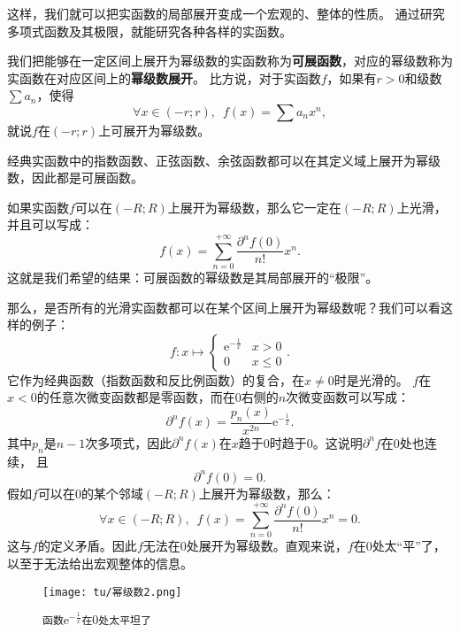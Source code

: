 \documentclass[12pt,UTF8]{ctexbook}
\theoremstyle{definition}
\theoremstyle{plain}
\newtheorem{sk}{思考}[section]
\begin{document}
这样，我们就可以把实函数的局部展开变成一个宏观的、整体的性质。
通过研究多项式函数及其极限，就能研究各种各样的实函数。

我们把能够在一定区间上展开为幂级数的实函数称为\textbf{可展函数}，对应的幂级数称为实函数在对应区间上的\textbf{幂级数展开}。
比方说，对于实函数$f$，如果有$r>0$和级数$\sum a_n$，使得
$$\forall x\in (-r;r),\,\,\, f(x) = \sum a_n x^n,$$
就说$f$在$(-r;r)$上可展开为幂级数。

经典实函数中的指数函数、正弦函数、余弦函数都可以在其定义域上展开为幂级数，因此都是可展函数。

如果实函数$f$可以在$(-R;R)$上展开为幂级数，那么它一定在$(-R;R)$上光滑，并且可以写成：
$$ f(x) = \sum_{n=0}^{+\infty} \frac{\partial^n f(0)}{n!} x^n. $$
这就是我们希望的结果：可展函数的幂级数是其局部展开的“极限”。

那么，是否所有的光滑实函数都可以在某个区间上展开为幂级数呢？我们可以看这样的例子：
$$ f: x\mapsto \begin{cases} \mathrm{e}^{-\frac{1}{x}} & x > 0 \\ 0 & x \leqslant 0 \end{cases}.$$
它作为经典函数（指数函数和反比例函数）的复合，在$x\neq 0$时是光滑的。
$f$在$x<0$的任意次微变函数都是零函数，而在$0$右侧的$n$次微变函数可以写成：
$$ \partial^n f(x) = \frac{p_n(x)}{x^{2n}} \mathrm{e}^{-\frac{1}{x}}.$$
其中$p_n$是$n-1$次多项式，因此$\partial^n f(x)$在$x$趋于$0$时趋于$0$。这说明$\partial^n f$在$0$处也连续，
且
$$ \partial^n f(0) = 0.$$
假如$f$可以在$0$的某个邻域$(-R;R)$上展开为幂级数，那么：
$$ \forall x \in (-R;R) ,\,\,\, f(x) = \sum_{n=0}^{+\infty} \frac{\partial^n f(0)}{n!} x^n = 0. $$
这与$f$的定义矛盾。因此$f$无法在$0$处展开为幂级数。直观来说，$f$在$0$处太“平”了，以至于无法给出宏观整体的信息。

\begin{figure}[h] %
    \centering
    \texttt{[image: tu/幂级数2.png]}
    \caption*{\texttt{函数}$\displaystyle \mathrm{e}^{-\frac{1}{x}}$\texttt{在}$0$\texttt{处太平坦了}}
\end{figure}

\end{document}
